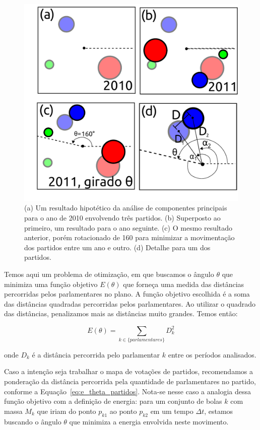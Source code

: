 \documentclass[
	article,			%
	12pt,				%
	oneside,			%
	a4paper,			%
	english,			%
	brazil,				%
	sumario=tradicional,
	oldfontcommands %
	]{abntex2}
\begin{document}
\begin{figure}[h]
  \centering
  \includegraphics[scale=0.5]{figs/rotacoes.pdf}
  \caption{(a) Um resultado hipotético da análise de componentes principais para o ano de 2010 envolvendo três partidos. (b) Superposto ao primeiro, um resultado para o ano seguinte. (c) O mesmo resultado anterior, porém rotacionado de 160\textdegree{} para minimizar a movimentação dos partidos entre um ano e outro. (d) Detalhe para um dos partidos.}
  \label{fig:rotacoes}
\end{figure}

Temos aqui um problema de otimização, em que buscamos o ângulo $\theta$ que minimiza uma função objetivo $E(\theta)$ que forneça uma medida das distâncias percorridas pelos parlamentares no plano. A função objetivo escolhida é a soma das distâncias quadradas percorridas pelos parlamentares. Ao utilizar o quadrado das distâncias, penalizamos mais as distâncias muito grandes. Temos então:

\begin{equation}
E(\theta)=\sum_{k\in\{parlamentares\}} D_{k}^{2}
\label{eq:e_theta}
\end{equation}

onde $D_{k}$ é a distância percorrida pelo parlamentar $k$ entre os períodos analisados.

Caso a intenção seja trabalhar o mapa de votações de partidos, recomendamos a ponderação da distância percorrida pela quantidade de parlamentares no partido, conforme a Equação~\ref{eq:e_theta_partidos}. Nota-se nesse caso a analogia dessa função objetivo com a definição de energia: para um conjunto de bolas $k$ com massa $M_{k}$ que iriam do ponto $p_{k1}$ ao ponto $p_{k2}$ em um tempo $\Delta t$, estamos buscando o ângulo $\theta$ que minimiza a energia envolvida neste movimento. 
\end{document}

